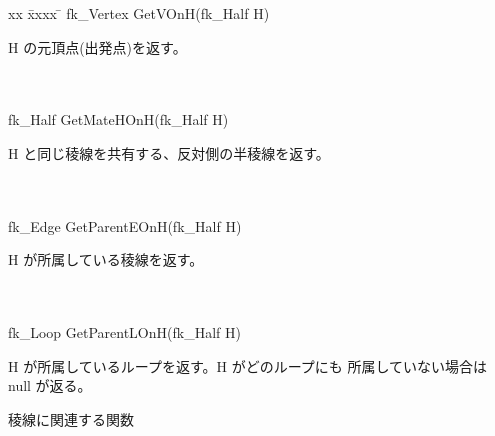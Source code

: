 \begin{tabbing}
xx \= xxxx \= \kill
\> fk\_Vertex GetVOnH(fk\_Half H) \\
	\> \> \begin{minipage}[]{15cm}
		H の元頂点(出発点)を返す。
	\end{minipage} \\ \\

\> fk\_Half GetMateHOnH(fk\_Half H) \\
	\> \> \begin{minipage}[]{15cm}
		H と同じ稜線を共有する、反対側の半稜線を返す。
	\end{minipage} \\ \\

\> fk\_Edge GetParentEOnH(fk\_Half H) \\
	\> \> \begin{minipage}[]{15cm}
		H が所属している稜線を返す。
	\end{minipage} \\ \\

\> fk\_Loop GetParentLOnH(fk\_Half H) \\
	\> \> \begin{minipage}[]{15cm}
		H が所属しているループを返す。H がどのループにも
		所属していない場合は null が返る。
	\end{minipage}
\end{tabbing}
\begin{center}
{\large 稜線に関連する関数}
\end{center}
